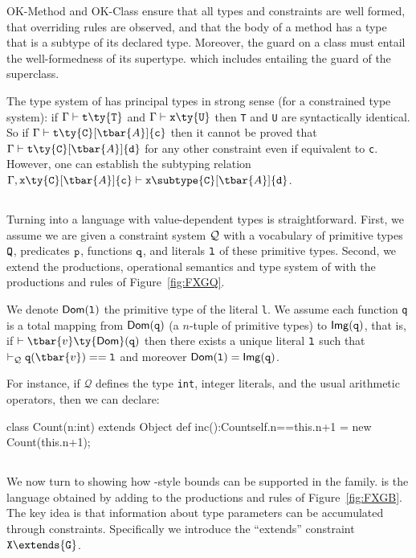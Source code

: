 {\sc OK-Method} and {\sc OK-Class} ensure that all types and constraints are well formed, that overriding rules are observed, and that the body of a method has a type that is a subtype of its declared type. Moreover, the guard on a class must entail the well-formedness of its supertype. which includes entailing the guard of the superclass.

The type system of \FXGL{\cdot} has principal types in strong sense (for a constrained type system): if $\Gamma\vdash {\tt t}\ty{\tt T}$ and $\Gamma\vdash {\tt x}\ty{\tt U}$ then {\tt T} and {\tt U} are syntactically identical. So if $\Gamma\vdash {\tt t}\ty{\tt C}[\tbar{A}]\{{\tt c}\}$ then it cannot be proved that $\Gamma\vdash {\tt t}\ty{\tt C}[\tbar{A}]\{{\tt d}\}$ for any other constraint even if equivalent to {\tt c}. However, one can establish the subtyping relation $\Gamma,{\tt x}\ty{\tt C}[\tbar{A}]\{{\tt c}\}\vdash {\tt x}\subtype{\tt C}[\tbar{A}]\{{\tt d}\}$.

\subsection{}

Turning \FXGL{\cdot} into a language with value-dependent types is straightforward. First, we assume we are given a constraint system $\cal Q$ with a vocabulary of primitive types ${\tt Q}$, predicates ${\tt p}$, functions ${\tt q}$, and literals ${\tt l}$ of these primitive types. Second, we extend the productions, operational semantics and type system of \FXGL{\cdot} with the productions and rules of Figure~\ref{fig:FXGQ}.

We denote $\Dom({\tt l})$ the primitive type of the literal {\tt l}. We assume each function {\tt q}
is a total mapping from ${\sf Dom}({\tt q})$ (a $n$-tuple of primitive types) to ${\sf Img}({\tt q})$, that is, if $\vdash \tbar{v}\ty{\sf Dom}({\tt q})$ then there exists a unique literal $\tt l$ such that $\vdashQ {\tt q}(\tbar{v})=={\tt l}$ and moreover $\Dom({\tt l})={\sf Img}({\tt q})$.

For instance, if $\mathcal{Q}$ defines the type {\tt int}, integer literals, and the usual arithmetic operators, then we can declare:

\begin{xten}
class Count(n:int) extends Object {
  def inc():Count{self.n==this.n+1} =
  	new Count(this.n+1);
}
\end{xten}

\subsection{}
We now turn to showing how \FGJ{}-style bounds can be supported in the \FXGL{\cdot} family.
 is the language obtained by adding to \FXGL{\cdot} the productions and rules of Figure~\ref{fig:FXGB}.
The key idea is that information about type parameters can be accumulated through constraints. Specifically we introduce the ``extends'' constraint \mbox{${\tt X}\extends{\tt G}$}.

